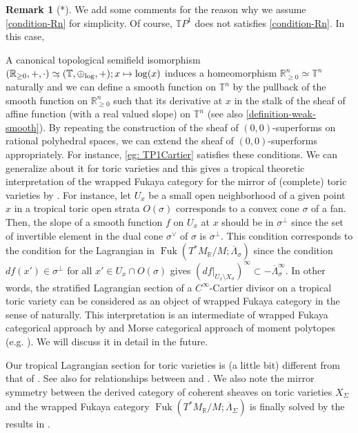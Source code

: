 \documentclass[a4paper,dvipdfmx,reqno,12pt]{amsart}
\theoremstyle{definition}
\newtheorem{remark}[theorem]{Remark}
\newcommand{\mb}[1]{\mathbb{#1}}%
\newcommand{\opn}[1]{\operatorname{#1}}
\newcommand{\simto}{ 
\mathrel{\raisebox{0.13em}{${\sim}$}}
\kern -0.75em \mathrel{\raisebox{-0.11em}{${\scriptstyle \to}$}}  
}
\numberwithin{equation}{section}
\begin{document}
\begin{remark}[*]

We add some comments for the reason 
why we assume \cref{condition-Rn} for simplicity.
Of course, $\mathbb{T}P^{1}$ does not satisfies
\cref{condition-Rn}. In this case, 

A canonical topological semifield isomorphism 
$({\mathbb{R}}_{\geq 0},+,\cdot)\simto 
(\mb{T},\oplus_{\opn{log}},+);x\mapsto \log(x)$
induces a homeomorphism ${\mathbb{R}}_{\geq 0}^{n}\simeq \mb{T}^{n}$
naturally and we can define a smooth function on 
$\mb{T}^{n}$ by the pullback of the smooth function on 
${\mathbb{R}}_{\geq 0}^{n}$ such that its derivative at $x$ in
the stalk of the sheaf of affine function
(with a real valued slope) on $\mb{T}^{n}$
(see also \cref{definition-weak-smooth}).
 By repeating
the construction of the sheaf of $(0,0)$-superforms on 
rational polyhedral spaces, we can extend the sheaf of
$(0,0)$-superforms appropriately.
For instance, \cref{eg: TP1Cartier} satisfies 
these conditions. We can generalize about it for toric
varieties and this gives a tropical theoretic interpretation 
of the wrapped Fukaya category for the mirror of
(complete) toric varieties by \cite{MR2871160}.
For instance, let $U_{x}$ be a small open neighborhood of 
a given point $x$ in a tropical toric open strata $O(\sigma)$
 corresponds to a convex cone $\sigma$ of a fan.
Then, the slope of a smooth function $f$ on $U_{x}$ at $x$
should be in $\sigma^{\bot}$ since the set of 
invertible element
in the dual cone $\sigma^{\vee}$ of $\sigma$ is $\sigma^{\bot}$.
This condition corresponds to the condition for the Lagrangian
in $\opn{Fuk}(T^{*}M_{{\mathbb{R}}}/M;\overline{\Lambda}_{\sigma})$ 
\cite[3.1]{MR2871160} since
the condition $df(x')\in\sigma^{\bot}$ for all 
$x'\in U_x\cap O(\sigma)$ gives 
$(df|_{U_{x}\setminus X_{\sigma}})^{\infty}\subset 
-\overline{\Lambda}_{\sigma}^{\infty}$.
In other words, the stratified Lagrangian section 
of a $C^{\infty}$-Cartier divisor on a tropical toric variety
can be considered as 
an object of wrapped Fukaya category in the sense of
\cite{MR2871160} naturally. This interpretation is 
an intermediate of wrapped Fukaya categorical approach by
\cite{MR2871160}
and Morse categorical approach of moment polytopes
(e.g. \cite{MR4234675}).
We will discuss it in detail in the future.

Our tropical Lagrangian section for toric varieties is 
(a little bit)
different from that of \cite{MR2240909,MR2529936}.
See also \cite[Appendix C.2]{MR2871160} for relationships
between \cite{MR2871160} and \cite{MR2240909,MR2529936}.
We also note the mirror symmetry between the derived category of
coherent sheaves on toric varieties $X_{\Sigma}$ and
the wrapped Fukaya category 
$\opn{Fuk}(T^{*}M_{{\mathbb{R}}}/M;\overline{\Lambda}_{\Sigma})$
is finally solved by the results in \cite{MR4132582}.
\end{remark}
\end{document}
